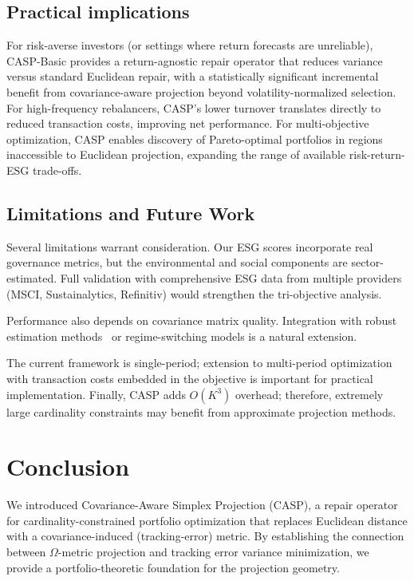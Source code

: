 \documentclass[10pt,twocolumn,a4paper]{article}
\begin{document}
\subsection{Practical implications}

For risk-averse investors (or settings where return forecasts are unreliable), CASP-Basic provides a return-agnostic repair operator that reduces variance versus standard Euclidean repair, with a statistically significant incremental benefit from covariance-aware projection beyond volatility-normalized selection. For high-frequency rebalancers, CASP's lower turnover translates directly to reduced transaction costs, improving net performance. For multi-objective optimization, CASP enables discovery of Pareto-optimal portfolios in regions inaccessible to Euclidean projection, expanding the range of available risk-return-ESG trade-offs.

\subsection{Limitations and Future Work}

Several limitations warrant consideration. Our ESG scores incorporate real governance metrics, but the environmental and social components are sector-estimated. Full validation with comprehensive ESG data from multiple providers (MSCI, Sustainalytics, Refinitiv) would strengthen the tri-objective analysis.

Performance also depends on covariance matrix quality. Integration with robust estimation methods~\cite{ledoit2020analytical} or regime-switching models is a natural extension.

The current framework is single-period; extension to multi-period optimization with transaction costs embedded in the objective is important for practical implementation. Finally, CASP adds $O(K^3)$ overhead; therefore, extremely large cardinality constraints may benefit from approximate projection methods.

\section{Conclusion}
\label{sec:conclusion}

We introduced Covariance-Aware Simplex Projection (CASP), a repair operator for cardinality-constrained portfolio optimization that replaces Euclidean distance with a covariance-induced (tracking-error) metric. By establishing the connection between $\Omega$-metric projection and tracking error variance minimization, we provide a portfolio-theoretic foundation for the projection geometry.
\end{document}
